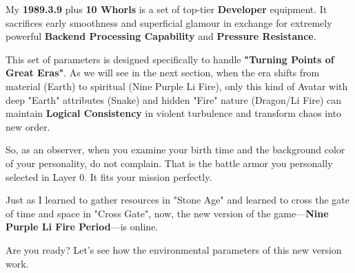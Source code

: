 My \textbf{1989.3.9} plus \textbf{10 Whorls} is a set of top-tier \textbf{Developer} equipment. It sacrifices early smoothness and superficial glamour in exchange for extremely powerful \textbf{Backend Processing Capability} and \textbf{Pressure Resistance}.

This set of parameters is designed specifically to handle \textbf{"Turning Points of Great Eras"}. As we will see in the next section, when the era shifts from material (Earth) to spiritual (Nine Purple Li Fire), only this kind of Avatar with deep "Earth" attributes (Snake) and hidden "Fire" nature (Dragon/Li Fire) can maintain \textbf{Logical Consistency} in violent turbulence and transform chaos into new order.

So, as an observer, when you examine your birth time and the background color of your personality, do not complain. That is the battle armor you personally selected in Layer 0. It fits your mission perfectly.

Just as I learned to gather resources in "Stone Age" and learned to cross the gate of time and space in "Cross Gate", now, the new version of the game—\textbf{Nine Purple Li Fire Period}—is online.

Are you ready? Let's see how the environmental parameters of this new version work.

